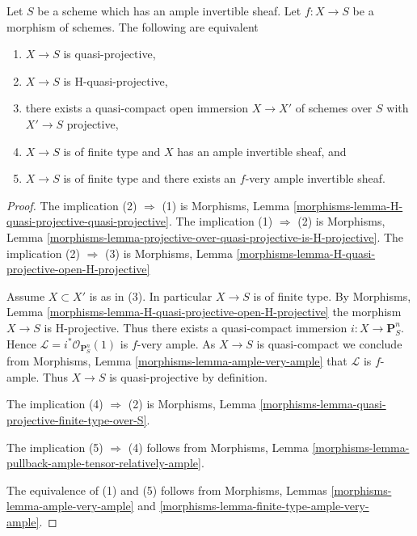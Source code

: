 \begin{lemma}
\label{lemma-quasi-projective}
Let $S$ be a scheme which has an ample invertible sheaf.
Let $f : X \to S$ be a morphism of schemes. The following are
equivalent
\begin{enumerate}
\item $X \to S$ is quasi-projective,
\item $X \to S$ is H-quasi-projective,
\item there exists a quasi-compact open immersion $X \to X'$ of schemes
over $S$ with $X' \to S$ projective,
\item $X \to S$ is of finite type and $X$ has an ample invertible
sheaf, and
\item $X \to S$ is of finite type and there exists an
$f$-very ample invertible sheaf.
\end{enumerate}
\end{lemma}

\begin{proof}
The implication (2) $\Rightarrow$ (1) is
Morphisms, Lemma \ref{morphisms-lemma-H-quasi-projective-quasi-projective}.
The implication (1) $\Rightarrow$ (2) is
Morphisms, Lemma
\ref{morphisms-lemma-projective-over-quasi-projective-is-H-projective}.
The implication (2) $\Rightarrow$ (3) is
Morphisms, Lemma \ref{morphisms-lemma-H-quasi-projective-open-H-projective}

\medskip\noindent
Assume $X \subset X'$ is as in (3). In particular $X \to S$ is
of finite type. By
Morphisms, Lemma \ref{morphisms-lemma-H-quasi-projective-open-H-projective}
the morphism $X \to S$ is H-projective.
Thus there exists a quasi-compact immersion $i : X \to \mathbf{P}^n_S$.
Hence $\mathcal{L} = i^*\mathcal{O}_{\mathbf{P}^n_S}(1)$
is $f$-very ample. As $X \to S$ is quasi-compact we conclude from
Morphisms, Lemma \ref{morphisms-lemma-ample-very-ample}
that $\mathcal{L}$ is $f$-ample. Thus $X \to S$ is quasi-projective
by definition.

\medskip\noindent
The implication (4) $\Rightarrow$ (2) is
Morphisms, Lemma \ref{morphisms-lemma-quasi-projective-finite-type-over-S}.

\medskip\noindent
The implication (5) $\Rightarrow$ (4) follows from
Morphisms, Lemma \ref{morphisms-lemma-pullback-ample-tensor-relatively-ample}.

\medskip\noindent
The equivalence of (1) and (5) follows from
Morphisms, Lemmas \ref{morphisms-lemma-ample-very-ample} and
\ref{morphisms-lemma-finite-type-ample-very-ample}.
\end{proof}

